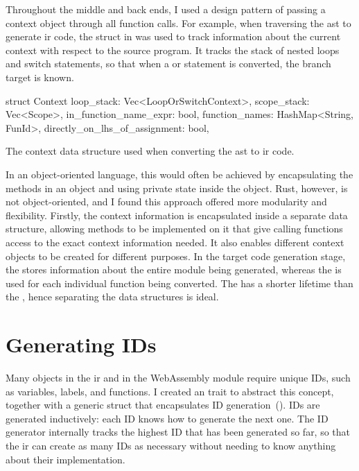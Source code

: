 \documentclass[../00-main.tex]{subfiles}
\begin{document}
Throughout the middle and back ends, I used a design pattern of passing a context object through all function calls.
For example, when traversing the \gls{ast} to generate \gls{ir} code, the  struct in  was used to track information about the current context with respect to the source program.
It tracks the stack of nested loops and switch statements, so that when a  or  statement is converted, the branch target is known.

\begin{listing}[t]
  \begin{RustListing}
    struct Context {
        loop_stack: Vec<LoopOrSwitchContext>,
        scope_stack: Vec<Scope>,
        in_function_name_expr: bool,
        function_names: HashMap<String, FunId>,
        directly_on_lhs_of_assignment: bool,
    }
  \end{RustListing}
  \caption{The context data structure used when converting the \gls{ast} to \gls{ir} code.}
  \label{lst:AST to IR context struct}
\end{listing}

In an object-oriented language, this would often be achieved by encapsulating the methods in an object and using private state inside the object.
Rust, however, is not object-oriented, and I found this approach offered more modularity and flexibility.
Firstly, the context information is encapsulated inside a separate data structure, allowing methods to be implemented on it that give calling functions access to the exact context information needed.
It also enables different context objects to be created for different purposes.
In the target code generation stage, the  stores information about the entire module being generated, whereas the  is used for each individual function being converted.
The  has a shorter lifetime than the , hence separating the data structures is ideal.

\section{Generating IDs}\label{app:sec:generating IDs}

Many objects in the \gls{ir} and in the WebAssembly module require unique IDs, such as variables, labels, and functions.
I created an  trait to abstract this concept, together with a generic  struct that encapsulates ID generation~().
IDs are generated inductively: each ID knows how to generate the next one.
The ID generator internally tracks the highest ID that has been generated so far, so that the \gls{ir} can create as many IDs as necessary without needing to know anything about their implementation.
\end{document}
